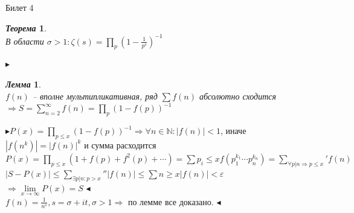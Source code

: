 \documentclass[a4paper,12pt]{article}
\newtheorem{teo}{\textit{Теорема}}
\newtheorem{lem}{\textit{Лемма}}
\newcommand{\q}{\quad}
\newcommand{\pb}{\blacktriangleright}
\newcommand{\pe}{\blacktriangleleft}
\newcommand{\Ra}{\Rightarrow}
\newcommand{\bb}[1]{\mathbb{#1}}
\newcommand{\SL}{\sum\limits}
\begin{document}
\begin{mybox}{\hypertarget{bil4}{Билет 4}}
\begin{teo}\q\\
В области $\sigma > 1: \zeta(s) = \prod\limits_p (1 - \frac{1}{p^s})^{-1}$
\end{teo}
$\pb$
\begin{lem}\q\\
$f(n)$ -- вполне мультипликативная, ряд $\sum f(n)$ абсолютно сходится $\Ra S = \SL_{n=2}^\infty f(n) = \prod\limits_p (1-f(p))^{-1}  $
\end{lem}
$\pb P(x) = \prod\limits_{p\le x} (1-f(p))^{-1}  \Ra \forall n\in\bb{N}: |f(n)| < 1$, иначе $|f(n^k)| = |f(n)|^k$ и сумма расходится\\
$P(x) = \prod\limits_{p\le x} (1 + f(p) + f^2(p) + \cdots) = \SL{p_i\le x} f(p_1^{k_1}\cdots p_n^{k_n}) = \SL_{\forall p|n\Ra p \le x}' f(n)$\\
$|S-P(x)| \le \SL_{\exists p|n:p>x}''|f(n)|\le\SL{n \ge x}|f(n)| < \varepsilon$\\
$\Ra\lim\limits_{x\to\infty}P(x) = S$
$\pe$\\
$f(n) = \frac{1}{n^s}, s = \sigma + it, \sigma > 1\Ra$ по лемме все доказано. $\pe$

\end{mybox}
\end{document}
